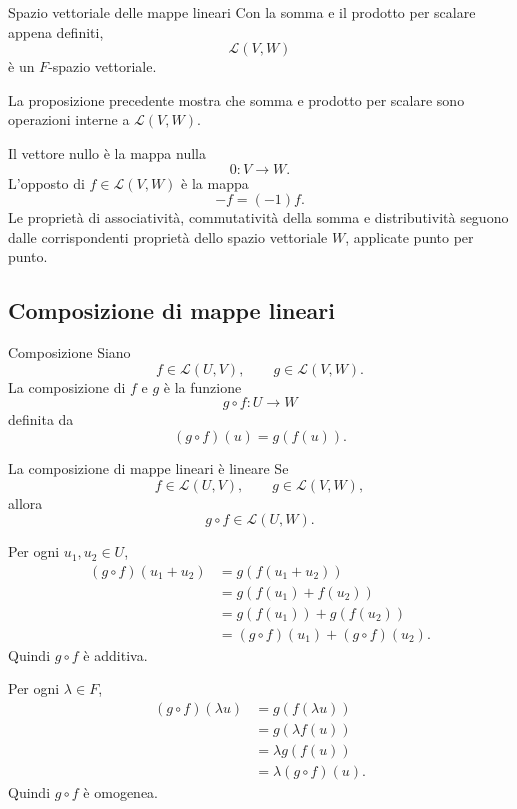 \documentclass[a4paper]{article}
\begin{document}
\begin{snippetproposition}{Spazio vettoriale delle mappe lineari}
    Con la somma e il prodotto per scalare appena definiti,
    \[
        \mathcal{L}(V,W)
    \]
    è un \(F\)-spazio vettoriale.
\end{snippetproposition}

\begin{snippetproof}{}
    La proposizione precedente mostra che somma e prodotto per scalare sono operazioni interne a \(\mathcal{L}(V,W)\).

    Il vettore nullo è la mappa nulla
    \[
        0:V\to W.
    \]
    L'opposto di \(f\in\mathcal{L}(V,W)\) è la mappa
    \[
        -f=(-1)f.
    \]
    Le proprietà di associatività, commutatività della somma e distributività seguono dalle corrispondenti proprietà dello spazio vettoriale \(W\), applicate punto per punto.
\end{snippetproof}

\subsection{Composizione di mappe lineari}

\begin{snippetdefinition}{Composizione}
    Siano
    \[
        f\in\mathcal{L}(U,V),
        \qquad
        g\in\mathcal{L}(V,W).
    \]
    La composizione di \(f\) e \(g\) è la funzione
    \[
        g\circ f:U\to W
    \]
    definita da
    \[
        (g\circ f)(u)=g(f(u)).
    \]
\end{snippetdefinition}

\begin{snippetproposition}{La composizione di mappe lineari è lineare}
    Se
    \[
        f\in\mathcal{L}(U,V),
        \qquad
        g\in\mathcal{L}(V,W),
    \]
    allora
    \[
        g\circ f\in\mathcal{L}(U,W).
    \]
\end{snippetproposition}

\begin{snippetproof}{}
    Per ogni \(u_1,u_2\in U\),
    \begin{align*}
        (g\circ f)(u_1+u_2)
        &=g(f(u_1+u_2))\\
        &=g(f(u_1)+f(u_2))\\
        &=g(f(u_1))+g(f(u_2))\\
        &=(g\circ f)(u_1)+(g\circ f)(u_2).
    \end{align*}
    Quindi \(g\circ f\) è additiva.

    Per ogni \(\lambda\in F\),
    \begin{align*}
        (g\circ f)(\lambda u)
        &=g(f(\lambda u))\\
        &=g(\lambda f(u))\\
        &=\lambda g(f(u))\\
        &=\lambda(g\circ f)(u).
    \end{align*}
    Quindi \(g\circ f\) è omogenea.
\end{snippetproof}
\end{document}
